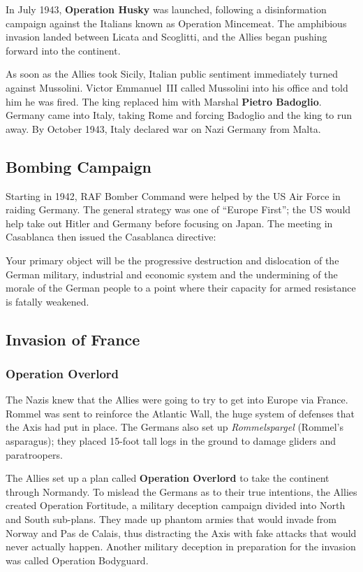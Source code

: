 In July 1943, \textbf{Operation Husky} was launched,
following a disinformation campaign against the Italians known as Operation Mincemeat.
The amphibious invasion landed between Licata and Scoglitti,
and the Allies began pushing forward into the continent.

As soon as the Allies took Sicily, Italian public sentiment immediately turned against Mussolini.
Victor Emmanuel~III called Mussolini into his office and told him he was fired.
The king replaced him with Marshal \textbf{Pietro Badoglio}.
Germany came into Italy, taking Rome and forcing Badoglio and the king to run away.
By October 1943, Italy declared war on Nazi Germany from Malta.

\subsection*{Bombing Campaign}

Starting in 1942, RAF Bomber Command were helped by the US Air Force in raiding Germany.
The general strategy was one of ``Europe First'';
the US would help take out Hitler and Germany before focusing on Japan.
The meeting in Casablanca then issued the Casablanca directive:
\begin{quoting}
Your primary object will be the progressive destruction and dislocation
of the German military, industrial and economic system
and the undermining of the morale of the German people
to a point where their capacity for armed resistance is fatally weakened.
\end{quoting}

\subsection*{Invasion of France}

\subsubsection*{Operation Overlord}

The Nazis knew that the Allies were going to try to get into Europe via France.
Rommel was sent to reinforce the Atlantic Wall, the huge system of defenses that the Axis had put in place.
The Germans also set up \textit{Rommelspargel} (Rommel's asparagus);
they placed 15-foot tall logs in the ground to damage gliders and paratroopers.

The Allies set up a plan called \textbf{Operation Overlord} to take the continent through Normandy.
To mislead the Germans as to their true intentions, the Allies created Operation Fortitude,
a military deception campaign divided into North and South sub-plans.
They made up phantom armies that would invade from Norway and Pas de Calais,
thus distracting the Axis with fake attacks that would never actually happen.
Another military deception in preparation for the invasion was called Operation Bodyguard.

